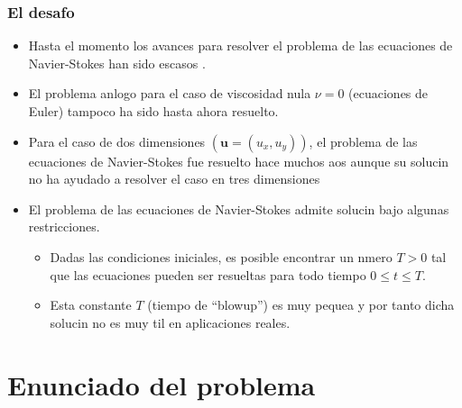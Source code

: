 \documentclass[serif,9pt]{beamer}
\begin{document}
\begin{frame}\frametitle{El desafo} 

\begin{itemize}

\item Hasta el momento los avances para resolver el problema de las ecuaciones de Navier-Stokes han sido escasos \cite{Devlin}.
\pause
\medskip

\item El problema anlogo para el caso de viscosidad nula $\nu=0$ (ecuaciones de Euler) tampoco ha sido hasta ahora resuelto.  \pause
\medskip

\item Para el caso de dos dimensiones $(\mathbf{u}=(u_x,u_y))$, el problema de las ecuaciones de Navier-Stokes fue resuelto hace muchos aos aunque su solucin no ha ayudado a resolver el caso en tres dimensiones
\pause
\medskip

\item El problema de las ecuaciones de Navier-Stokes admite solucin bajo algunas restricciones. 
\pause
\medskip
\begin{itemize}
\item Dadas las condiciones iniciales, es posible encontrar un nmero $T>0$ tal que las ecuaciones pueden ser resueltas para todo tiempo $0\le t\le T$.
\pause
\medskip
\item Esta constante $T$ (tiempo de ``blowup'') es muy pequea y por tanto dicha solucin no es muy til en aplicaciones reales.
\end{itemize}

\end{itemize}
\end{frame}


\section{Enunciado del problema} \label{enunciado}
\end{document}
